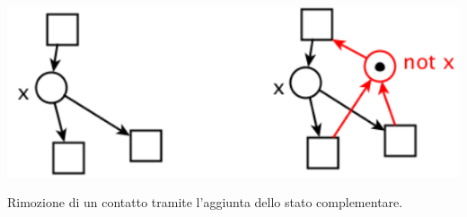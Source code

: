 \begin{marginfigure}[-10cm]
    \includegraphics[width=1\linewidth]{img/contatto_complementare.png}
    \caption{Rimozione di un contatto tramite l'aggiunta dello stato complementare.}
    \label{fig:sistema_con_contatti}
\end{marginfigure}

